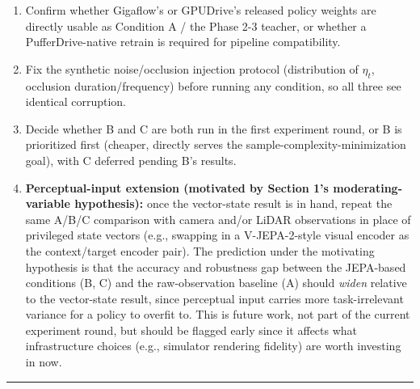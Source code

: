 \documentclass[11pt]{article}
\providecommand{\tightlist}{%
  \setlength{\itemsep}{0pt}\setlength{\parskip}{0pt}}
\begin{document}
\begin{enumerate}
\def\labelenumi{\arabic{enumi}.}
\tightlist
\item
  Confirm whether Gigaflow's or GPUDrive's released policy weights are directly usable as Condition A / the Phase 2-3 teacher, or whether a PufferDrive-native retrain is required for pipeline compatibility.
\item
  Fix the synthetic noise/occlusion injection protocol (distribution of \(\eta_t\), occlusion duration/frequency) before running any condition, so all three see identical corruption.
\item
  Decide whether B and C are both run in the first experiment round, or B is prioritized first (cheaper, directly serves the sample-complexity-minimization goal), with C deferred pending B's results.
\item
  \textbf{Perceptual-input extension (motivated by Section 1's moderating-variable hypothesis):} once the vector-state result is in hand, repeat the same A/B/C comparison with camera and/or LiDAR observations in place of privileged state vectors (e.g., swapping in a V-JEPA-2-style visual encoder as the context/target encoder pair). The prediction under the motivating hypothesis is that the accuracy and robustness gap between the JEPA-based conditions (B, C) and the raw-observation baseline (A) should \emph{widen} relative to the vector-state result, since perceptual input carries more task-irrelevant variance for a policy to overfit to. This is future work, not part of the current experiment round, but should be flagged early since it affects what infrastructure choices (e.g., simulator rendering fidelity) are worth investing in now.
\end{enumerate}

\begin{center}\rule{0.5\linewidth}{0.5pt}\end{center}




\end{document}
